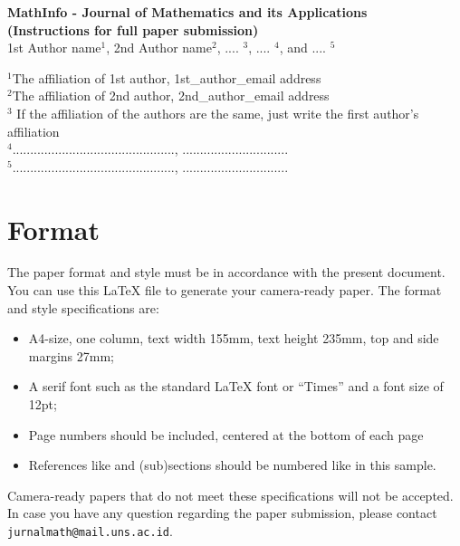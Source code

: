 \documentclass[12pt]{article}
\begin{document}
\baselineskip 12pt

\begin{center}
\textbf{\Large MathInfo - Journal of Mathematics and its Applications \\ (Instructions for full paper submission)} \\

\vspace{1.5cc}
{ \sc 1st Author name$^{1}$, 2nd Author name$^{2}$, .... $^{3}$, .... $^{4}$, and .... $^{5}$}\\

\vspace{0.3 cm}

{\small $^{1}$The affiliation  of 1st author, 1st\_author\_email address\\ $^{2}$The affiliation  of 2nd author, 2nd\_author\_email address\\
$^{3}$ If the affiliation  of the authors are the same, just write the first author's affiliation\\
$^{4}$.............................................., ..............................\\
$^{5}$.............................................., ..............................}
 \end{center}
\vspace{1.5cc}

\begin{abstract}
  \noindent  This paper is a sample prepared to illustrate the use of the  \LaTeX{} document to be published in MathInfo - Journal of Mathematics and its Applications.

\vspace{0.95cc}
\parbox{24cc}{{\it Key words and Phrases}:%
}
\end{abstract}

\section{Format} \label{form}
The paper format and style must be in accordance with the present document. You can use
this \LaTeX{} file to generate your camera-ready paper. The format and style
specifications are:
\begin{itemize}
\item A4-size, one column, text width 155mm, text height 235mm, top and side margins
27mm;
\item A serif font such as the standard \LaTeX{} font or ``Times'' and a font size
of 12pt;
\item Page numbers should be included, centered at the bottom of each page
\item References like \cite{ex} and (sub)sections should be numbered like in this sample.
\end{itemize}
Camera-ready papers that do not meet these specifications will not be accepted.
\newline\noindent
In case you have any question regarding the paper submission,
please contact  \verb+jurnalmath@mail.uns.ac.id+.
\end{document}
